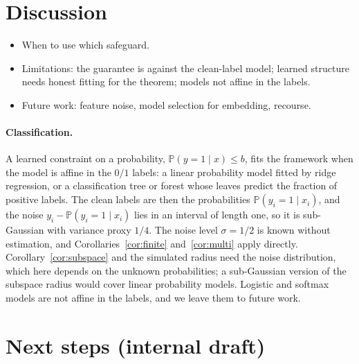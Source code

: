 \section{Discussion}

\begin{outline}
\begin{itemize}
  \item When to use which safeguard.
  \item Limitations: the guarantee is against the clean-label model; learned
    structure needs honest fitting for the theorem; models not affine in the
    labels.
  \item Future work: feature noise, model selection for embedding, recourse.
\end{itemize}
\end{outline}

\paragraph{Classification.}
A learned constraint on a probability, $\mathbb{P}(y = 1 \mid x) \le b$, fits
the framework when the model is affine in the $0/1$ labels: a linear
probability model fitted by ridge regression, or a classification tree or
forest whose leaves predict the fraction of positive labels. The clean labels
are then the probabilities $\mathbb{P}(y_i = 1 \mid x_i)$, and the noise
$y_i - \mathbb{P}(y_i = 1 \mid x_i)$ lies in an interval of length one, so it
is sub-Gaussian with variance proxy $1/4$. The noise level $\sigma = 1/2$ is
known without estimation, and Corollaries~\ref{cor:finite}
and~\ref{cor:multi} apply directly. Corollary~\ref{cor:subspace} and the
simulated radius need the noise distribution, which here depends on the
unknown probabilities; a sub-Gaussian version of the subspace radius would
cover linear probability models. Logistic and softmax models are not affine
in the labels, and we leave them to future work.

\section*{Next steps (internal draft)}

